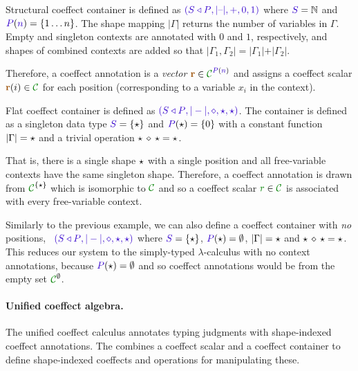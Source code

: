 \begin{example}
\label{ex:unified-struct-shape}
Structural coeffect container is defined as $\sclrd{(\SHP, {|}\textnormal{--}{|}, +, 0, 1)}$
where $\SH=\mathbb{N}$ and $\SP(\sclrd{n})=\{ 1 \ldots n \}$. The shape mapping ${|}\Gamma{|}$ returns the 
number of variables in $\Gamma$. Empty and singleton contexts are annotated with $0$ and $1$, 
respectively, and shapes of combined contexts are added so that ${|}\Gamma_1, \Gamma_2{|} = 
{|}\Gamma_1{|} + {|}\Gamma_2{|}$. 

Therefore, a coeffect annotation is a \emph{vector} 
$\aclrd{\textbf{r}} \in \C^{\SP(\sclrd{n})}$ and assigns a coeffect scalar $\aclrd{\textbf{r}}(i) \in \C$ 
for each position (corresponding to a variable $x_i$ in the context).
\end{example}

\begin{example}
\label{ex:unified-flat-shape}
Flat coeffect container is defined as $\sclrd{(\SHP, {|}-{|}, \diamond, \sflat, \sflat)}$.
The container is defined as a singleton data type $\SH = \{\sflat \}$ and $\SP(\sflat) = \{ 0 \}$
with a constant function ${|}\Gamma{|}=\star$ and a trivial operation $\star\,\diamond\,\star = \star$. 

That is, there is a single shape
$\star$ with a single position and all free-variable contexts have the same singleton shape.
Therefore, a coeffect annotation is drawn from $\C^{\{\sflat\}}$ which is isomorphic to $\C$
and so a coeffect scalar $\cclrd{r}\in \C$ is associated with every free-variable context.
\end{example}

\begin{example}
Similarly to the previous example, we can also define a coeffect container with \emph{no} positions,
\ie~$\sclrd{(\SHP, {|}-{|}, \diamond, \sflat, \sflat)}$ where $\SH = \{\sflat \}$, $\SP(\sflat) = \emptyset$,
${|}\Gamma{|}=\star$ and $\star\,\diamond\,\star = \star$. 
This reduces our system to the simply-typed $\lambda$-calculus with no context annotations, because
$\SP(\sflat)=\emptyset$ and so coeffect annotations would be from the empty set $\C^\emptyset$.
\end{example}


\paragraph{Unified coeffect algebra.}
The unified coeffect calculus annotates typing judgments with shape-indexed coeffect annotations.
The \emph{} combines a coeffect scalar and a coeffect container
to define shape-indexed coeffects and operations for manipulating these. 

